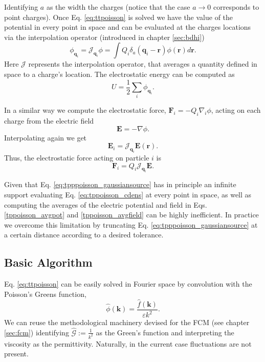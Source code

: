 \documentclass[twoside,openright,titlepage,numbers=noenddot,%
headinclude,footinclude,cleardoublepage=empty,abstract=on,
BCOR=5mm,fontsize=11pt, dvipsnames, paper=b5
]{scrreprt}
\renewcommand{\vec}[1]{\bm{#1}}
\newcommand{\oper}[1]{\mathcal{#1}}
\newcommand{\fou}[1]{\widehat{#1}}
\newcommand{\ppos}{q}
\newcommand{\fpos}{r}
\begin{document}
Identifying $a$ as the width the charges (notice that the case $a\rightarrow 0$ corresponds to point charges).
Once Eq. \eqref{eq:ttpoisson} is solved we have the value of the potential in every point in space and can be evaluated at the charges locations via the interpolation operator (introduced in chapter \ref{sec:bdhi})
\begin{equation}  
  \phi_{\vec{\ppos}_i} = \oper{J}_{\vec{\ppos}_i}\phi = \int Q_i\delta_a(\vec{\ppos}_i - \vec{\fpos})\phi(\vec{\fpos})d\vec{\fpos}.
\end{equation}
Here $\oper{J}$ represents the interpolation operator, that averages a quantity defined in space to a charge's location.
The electrostatic energy can be computed as
\begin{equation}
  \label{tppoisson_avgpot}
  U =  \frac{1}{2}\sum_i{\phi_{\vec{\ppos}_i}}.
\end{equation}

In a similar way we compute the electrostatic force, $\vec{F}_i = -Q_i\nabla_i{\phi}$, acting on each charge from the electric field
\begin{equation}
  \label{eq:tppoisson_fieldnablaphi}
  \vec{E} = -\nabla{\phi}.
\end{equation}
Interpolating again we get
\begin{equation}
  \label{tppoisson_avgfield}
\vec{E}_i = \oper{J}_{\vec{\ppos}_i}\vec{E}(\vec{\fpos}).
\end{equation}
Thus, the electrostatic force acting on particle $i$ is
\begin{equation}
  \label{eq:tppoisson_force}
\vec{F}_i = Q_i\oper{J}_{\vec{\ppos}_i}\vec{E}.
\end{equation}

Given that Eq. \eqref{eq:tpppoisson_gaussiansource} has in principle an infinite support evaluating Eq. \eqref{eq:tppoisson_cdens} at every point in space, as well as computing the averages of the electric potential and field in Eqs. \eqref{tppoisson_avgpot} and \eqref{tppoisson_avgfield} can be highly inefficient. In practice we overcome this limitation by truncating Eq. \eqref{eq:tpppoisson_gaussiansource} at a certain distance according to a desired tolerance.
\subsection*{Basic Algorithm}
Eq. \eqref{eq:ttpoisson} can be easily solved in Fourier space by convolution with the Poisson's Greens function,
\begin{equation}
  \label{tppoisson_phihat}
 \hat\phi(\vec{k}) = \frac{\hat f(\vec{k})}{\varepsilon k^2}.
\end{equation}
We can reuse the methodological machinery devised for the \gls{FCM} (see chapter \ref{sec:fcm}) identifying $\fou{\oper{G}} := \frac{1}{k^2}$ as the Green's function and interpreting the viscosity as the permittivity. Naturally, in the current case fluctuations are not present.
\end{document}
